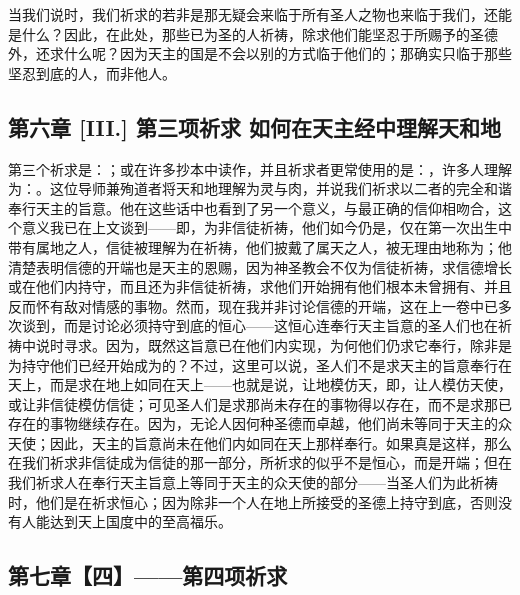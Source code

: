当我们说时，我们祈求的若非是那无疑会来临于所有圣人之物也来临于我们，还能是什么？因此，在此处，那些已为圣的人祈祷，除求他们能坚忍于所赐予的圣德外，还求什么呢？因为天主的国是不会以别的方式临于他们的；那确实只临于那些坚忍到底的人，而非他人。\par


\subsection{第六章 [III.] 第三项祈求 如何在天主经中理解天和地}

第三个祈求是：；或在许多抄本中读作，并且祈求者更常使用的是：，许多人理解为：。这位导师兼殉道者将天和地理解为灵与肉，并说我们祈求以二者的完全和谐奉行天主的旨意。他在这些话中也看到了另一个意义，与最正确的信仰相吻合，这个意义我已在上文谈到——即，为非信徒祈祷，他们如今仍是，仅在第一次出生中带有属地之人，信徒被理解为在祈祷，他们披戴了属天之人，被无理由地称为；他清楚表明信德的开端也是天主的恩赐，因为神圣教会不仅为信徒祈祷，求信德增长或在他们内持守，而且还为非信徒祈祷，求他们开始拥有他们根本未曾拥有、并且反而怀有敌对情感的事物。然而，现在我并非讨论信德的开端，这在上一卷中已多次谈到，而是讨论必须持守到底的恒心——这恒心连奉行天主旨意的圣人们也在祈祷中说时寻求。因为，既然这旨意已在他们内实现，为何他们仍求它奉行，除非是为持守他们已经开始成为的？不过，这里可以说，圣人们不是求天主的旨意奉行在天上，而是求在地上如同在天上——也就是说，让地模仿天，即，让人模仿天使，或让非信徒模仿信徒；可见圣人们是求那尚未存在的事物得以存在，而不是求那已存在的事物继续存在。因为，无论人因何种圣德而卓越，他们尚未等同于天主的众天使；因此，天主的旨意尚未在他们内如同在天上那样奉行。如果真是这样，那么在我们祈求非信徒成为信徒的那一部分，所祈求的似乎不是恒心，而是开端；但在我们祈求人在奉行天主旨意上等同于天主的众天使的部分——当圣人们为此祈祷时，他们是在祈求恒心；因为除非一个人在地上所接受的圣德上持守到底，否则没有人能达到天上国度中的至高福乐。\par


\subsection{第七章【四】——第四项祈求}

